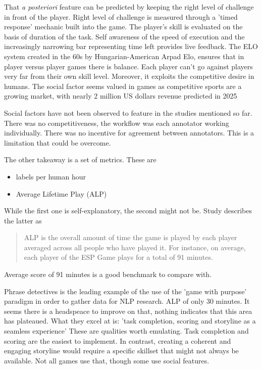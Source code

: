 \documentclass{report}
\begin{document}
That  \textit{a posteriori} feature can be predicted by keeping the right level of challenge in front of the player.  \cite{locke_theory_1991}
Right level of challenge is measured through a 'timed response' mechanic built into the game.
The player's skill is evaluated on the basis of duration of the task. 
Self awareness of the speed of execution and the increasingly narrowing bar representing time left provides live feedback.
The ELO system \cite{noauthor_elo_2023} created in the 60s by Hungarian-American Arpad Elo, ensures that in player versus player games there is balance. Each player can't go against players very far from their own skill level.
Moreover, it exploits the competitive desire in humans.
The social factor seems valued in games as competitive sports are a growing market, with nearly 2 million US dollars revenue predicted \cite{noauthor_global_nodate} in 2025

Social factors have not been observed to feature in the studies mentioned so far.
There was no competitiveness, the workflow was each annotator working individually.
There was no incentive for agreement between annotators.
This is a limitation that could be overcome.

The other takeaway is a set of metrics. These are
\begin{itemize}
  \item labels per human hour
  \item Average Lifetime Play (ALP)
\end{itemize}
While the first one is self-explanatory, the second might not be.
Study describes the latter as 
\begin{quote}
 ALP is the overall amount of time the game is played by each player averaged across all people who have played it. For instance, on average, each player of the ESP Game plays for a total of 91 minutes.
\end{quote}\cite[page 66]{von_ahn_designing_2008} 
Average score of 91 minutes is a good benchmark to compare with.

Phrase detectives \cite{poesio_phrase_2013} is the leading example of the use of the 'game with purpose' paradigm in order to gather data for NLP research.
ALP of only 30 minutes. It seems there is a headspeace to improve on that, nothing indicates that this area has plateaued.
What they excel at is: 'task completion, scoring and storyline as a seamless experience'
These are qualities worth emulating. Task completion and scoring are the easiest to implement. 
In contrast, creating a coherent and engaging storyline would require a specific skillset that might not always be available.
Not all games use that, though some use social features.
\end{document}
